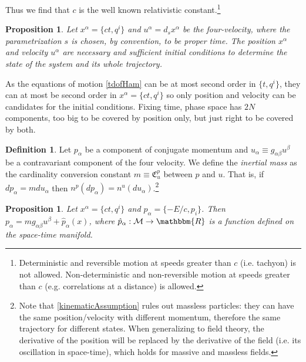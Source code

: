 \documentclass[aps,pra,10pt,twocolumn,floatfix,nofootinbib]{revtex4-1}
\newtheorem{prop}[thm]{Proposition}
\theoremstyle{definition}
\newtheorem{defn}[thm]{Definition}
\begin{document}
Thus we find that $c$ is the well known relativistic constant.\footnote{Deterministic and reversible motion at speeds greater than $c$ (i.e. tachyon) is not allowed. Non-deterministic and non-reversible motion at speeds greater than $c$ (e.g. correlations at a distance) is allowed.}

\begin{prop}\label{initialConditions}
Let $x^\alpha=\{ct, q^i\}$ and $u^\alpha = d_s x^\alpha$ be the four-velocity, where the parametrization $s$ is chosen, by convention, to be proper time. The position $x^\alpha$ and velocity $u^\alpha$ are necessary and sufficient initial conditions to determine the state of the system and its whole trajectory.
\end{prop}

As the equations of motion \ref{tdofHam} can be at most second order in $\{t, q^i\}$, they can at most be second order in $x^\alpha=\{ct, q^i\}$ so only position and velocity can be candidates for the initial conditions. Fixing time, phase space has $2N$ components, too big to be covered by position only, but just right to be covered by both.

\begin{defn}\label{inertialMass}
Let $p_\alpha$ be a component of conjugate momentum and $u_\alpha \equiv g_{\alpha \beta}u^\beta$ be a contravariant component of the four velocity. We define the \emph{inertial mass} as the cardinality conversion constant $m \equiv \mathfrak{C}^p_u$ between $p$ and $u$. That is, if $dp_\alpha=mdu_\alpha$ then $n^p(dp_\alpha)=n^u(du_\alpha)$.\footnote{Note that \ref{kinematicAssumption} rules out massless particles: they can have the same position/velocity with different momentum, therefore the same trajectory for different states. When generalizing to field theory, the derivative of the position will be replaced by the derivative of the field (i.e. its oscillation in space-time), which holds for massive and massless fields.}
\end{defn}

\begin{prop}\label{kineticMomentum}
Let $x^\alpha=\{ct, q^i\}$ and $p_\alpha=\{-E/c, p_i\}$. Then $p_\alpha= m g_{\alpha \beta}u^\beta + \hat{p}_\alpha(x)$, where $\hat{p}_\alpha : \mathcal{M} \rightarrow \mathbbm{R}$ is a function defined on the space-time manifold.
\end{prop}
\end{document}
